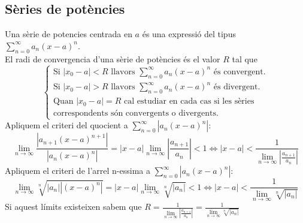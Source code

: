 \documentclass[../main.tex]{subfiles}
\begin{document}
    \subsection{Sèries de potències}
    Una sèrie de potencies centrada en $a$ és una expressió del tipus $\sum\limits_{n=0}^\infty a_n(x-a)^n$.\\
    El radi de convergencia d'una sèrie de potències és el valor $R$ tal que
    \begin{displaymath}\begin{cases}
        \text{Si } |x_0 - a| < R \text{ llavors } \sum\limits_{n=0}^\infty a_n(x-a)^n \text{ és convergent.}\\
        \text{Si } |x_0 - a| > R \text{ llavors } \sum\limits_{n=0}^\infty a_n(x-a)^n \text{ és divergent.}\\
        \text{Quan } |x_0 - a| = R \text{ cal estudiar en cada cas si les sèries}\\
        \text{correspondents són convergents o divergents.}
    \end{cases}\end{displaymath}
    Apliquem el criteri del quocient a $\sum\limits_{n=0}^\infty |a_n (x-a)^n|$:
    \begin{displaymath}
        \lim_{n \rightarrow \infty} \frac{|a_{n+1} (x-a)^{n+1}|}{|a_n (x-a)^n|} = |x-a| \lim_{n \rightarrow \infty} |\frac{a_{n+1}}{a_n}| < 1 \Leftrightarrow |x-a| < \frac{1}{\lim\limits_{n\rightarrow \infty} |\frac{a_{n+1}}{a_n}|}
    \end{displaymath}
    Apliquem el criteri de l'arrel n-essima a $\sum\limits_{n=0}^\infty |a_n (x-a)^n|$:
    \begin{displaymath}
        \lim_{n \rightarrow \infty} \sqrt[n]{|a_n| |(x-a)^n|}  = |x-a| \lim_{n \rightarrow \infty} \sqrt[n]{|a_n|} < 1 \Leftrightarrow |x-a| < \frac{1}{\lim\limits_{n\rightarrow \infty} \sqrt[n]{|a_n|}}
    \end{displaymath}
    Si aquest límits existeixen sabem que $R = \frac{1}{\lim\limits_{n\rightarrow \infty} |\frac{a_{n+1}}{a_n}|} = \frac{1}{\lim\limits_{n\rightarrow \infty} \sqrt[n]{|a_n|}}$
    
\end{document}
